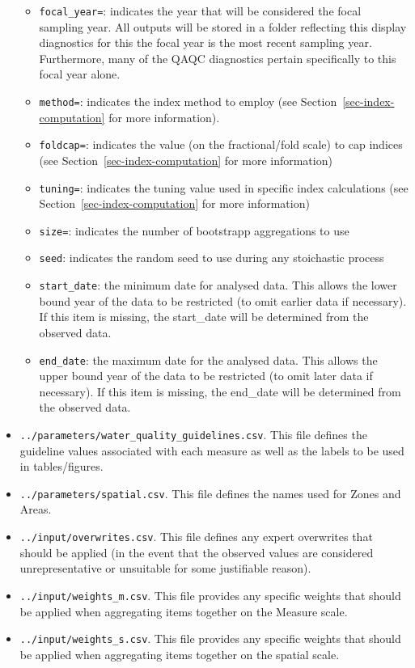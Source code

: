 \documentclass[
  8pt,
  a4paper]{article}
\providecommand{\tightlist}{%
  \setlength{\itemsep}{0pt}\setlength{\parskip}{0pt}}
\begin{document}
\begin{tcolorbox}
\begin{itemize}
  \begin{itemize}
  \tightlist
  \item
    \texttt{focal\_year=}: indicates the year that will be considered
    the focal sampling year. All outputs will be stored in a folder
    reflecting this display diagnostics for this the focal year is the
    most recent sampling year. Furthermore, many of the QAQC diagnostics
    pertain specifically to this focal year alone.
  \item
    \texttt{method=}: indicates the index method to employ (see
    Section~\ref{sec-index-computation} for more information).
  \item
    \texttt{foldcap=}: indicates the value (on the fractional/fold
    scale) to cap indices (see Section~\ref{sec-index-computation} for
    more information)
  \item
    \texttt{tuning=}: indicates the tuning value used in specific index
    calculations (see Section~\ref{sec-index-computation} for more
    information)
  \item
    \texttt{size=}: indicates the number of bootstrapp aggregations to
    use
  \item
    \texttt{seed}: indicates the random seed to use during any
    stoichastic process
  \item
    \texttt{start\_date}: the minimum date for analysed data. This
    allows the lower bound year of the data to be restricted (to omit
    earlier data if necessary). If this item is missing, the start\_date
    will be determined from the observed data.
  \item
    \texttt{end\_date}: the maximum date for the analysed data. This
    allows the upper bound year of the data to be restricted (to omit
    later data if necessary). If this item is missing, the end\_date
    will be determined from the observed data.
  \end{itemize}
\item
  \texttt{../parameters/water\_quality\_guidelines.csv}. This file
  defines the guideline values associated with each measure as well as
  the labels to be used in tables/figures.
\item
  \texttt{../parameters/spatial.csv}. This file defines the names used
  for Zones and Areas.
\item
  \texttt{../input/overwrites.csv}. This file defines any expert
  overwrites that should be applied (in the event that the observed
  values are considered unrepresentative or unsuitable for some
  justifiable reason).
\item
  \texttt{../input/weights\_m.csv}. This file provides any specific
  weights that should be applied when aggregating items together on the
  Measure scale.
\item
  \texttt{../input/weights\_s.csv}. This file provides any specific
  weights that should be applied when aggregating items together on the
  spatial scale.
\end{itemize}

\end{tcolorbox}
\end{document}
